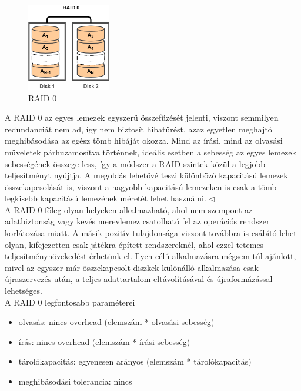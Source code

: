 \documentclass[tikz,12pt,margin=0px]{article}
\begin{document}
    \begin{figure}[H]
        \centering
        \includegraphics[width=0.325\textwidth]{img/raid0.png}
        \caption{RAID 0}
        \label{ref:raid0}
    \end{figure}

    {\footnotesize \noindent {\color{blue} \faLightbulbO\ $\triangleright$ } }
    {\footnotesize
    \noindent A RAID 0 az egyes lemezek egyszerű összefűzését jelenti, viszont semmilyen redundanciát nem ad, így nem biztosít hibatűrést, azaz egyetlen meghajtó meghibásodása az egész tömb hibáját okozza. Mind az írási, mind az olvasási műveletek párhuzamosítva történnek, ideális esetben a sebesség az egyes lemezek sebességének összege lesz, így a módszer a RAID szintek közül a legjobb teljesítményt nyújtja. A megoldás lehetővé teszi különböző kapacitású lemezek összekapcsolását is, viszont a nagyobb kapacitású lemezeken is csak a tömb legkisebb kapacitású lemezének méretét lehet használni.
    $\triangleleft$ \faLightbulbO}\\

    \noindent A RAID 0 főleg olyan helyeken alkalmazható, ahol nem szempont az adatbiztonság vagy kevés merevlemez csatolható fel az operációs rendszer korlátozása miatt. A másik pozitív tulajdonsága viszont továbbra is csábító lehet olyan, kifejezetten csak játékra épített rendszereknél, ahol ezzel tetemes teljesítménynövekedést érhetünk el. Ilyen célú alkalmazásra mégsem túl ajánlott, mivel az egyszer már összekapcsolt diszkek különálló alkalmazása csak újraszervezés után, a teljes adattartalom eltávolításával és újraformázással lehetséges.\\

    \noindent A RAID 0 legfontosabb paraméterei
    \begin{itemize}[topsep=8pt,itemsep=4pt,partopsep=4pt, parsep=4pt]
        \item olvasás: nincs overhead (elemszám * olvasási sebesség)
        \item írás: nincs overhead (elemszám * írási sebesség)
        \item tárolókapacitás: egyenesen arányos (elemszám * tárolókapacitás)
        \item meghibásodási tolerancia: nincs
    \end{itemize}
\end{document}
